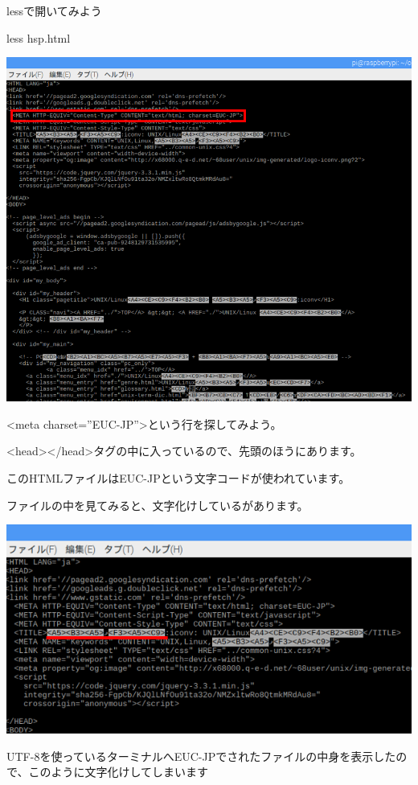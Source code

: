 \documentclass[a4paper,12pt,dvipdfmx]{jarticle}
\begin{document}
\bigskip

\clearpage
lessで開いてみよう

less hsp.html



\begin{center}
\includegraphics[width=17.006cm]{textbook-img021-1.png}

\end{center}
{\textless}meta
charset=”EUC-JP”{\textgreater}という行を探してみよう。

{\textless}head{\textgreater}{\textless}/head{\textgreater}タグの中に入っているので、先頭のほうにあります。

このHTMLファイルはEUC-JPという文字コードが使われています。

ファイルの中を見てみると、文字化けしているがあります。



\begin{center}
\includegraphics[width=17.006cm]{textbook-img021-2.png}

\end{center}
UTF-8を使っているターミナルへEUC-JPでされたファイルの中身を表示したので、このように文字化けしてしまいます
\end{document}
